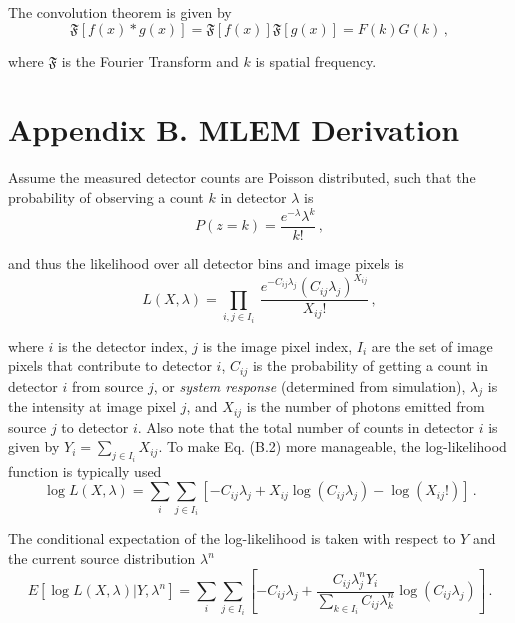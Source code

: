\documentclass[10pt]{article}
\begin{document}
\noindent The convolution theorem is given by
%
\begin{equation} \tag{A.3}
	\mathfrak{F}[f(x) \ast g(x)] = \mathfrak{F}[f(x)] \mathfrak{F}[g(x)] = F(k)G(k)\,,
\end{equation}

\noindent where $\mathfrak{F}$ is the Fourier Transform and $k$ is spatial frequency.


\section*{Appendix B. MLEM Derivation}

Assume the measured detector counts are Poisson distributed, such that the probability of observing a count $k$ in detector $\lambda$ is 
%
\begin{equation} \tag{B.1}
	P(z=k)  = \frac{e^{-\lambda} \lambda^k}{k!}\,,
\end{equation}

\noindent and thus the likelihood over all detector bins and image pixels is 
%
\begin{equation} \tag{B.2}
	L(X,\lambda) = \prod_{i,j\in I_i} \ \frac{e^{-C_{ij}\lambda_j} (C_{ij}\lambda_j)^{X_{ij}}}{X_{ij}!}\,,
\end{equation}

\noindent where $i$ is the detector index, $j$ is the image pixel index, $I_i$ are the set of image pixels that contribute to detector $i$, $C_{ij}$ is the probability of getting a count in detector $i$ from source $j$, or \emph{system response} (determined from simulation), $\lambda_j$ is the intensity at image pixel $j$, and $X_{ij}$ is the number of photons emitted from source $j$ to detector $i$. Also note that the total number of counts in detector $i$ is given by $Y_i=\sum_{j \in I_i} X_{ij}$. To make Eq. (B.2) more manageable, the log-likelihood function is typically used
%
\begin{equation} \tag{B.3}
	\log L(X,\lambda) = \sum_i \sum_{j \in I_i} \left[ -C_{ij} \lambda_j + X_{ij} \log (C_{ij} \lambda_j) - \log (X_{ij}!) \right]\,.
\end{equation}

\noindent The conditional expectation of the log-likelihood is taken with respect to $Y$ and the current source distribution $\lambda^n$
%
\begin{equation} \tag{B.4}
	E[\log L(X,\lambda) | Y,\lambda^n] = \sum_i \sum_{j \in I_i} \left[   -C_{ij} \lambda_j + \frac{C_{ij}\lambda_j^n Y_i}{\sum_{k \in I_i}C_{ij}\lambda_k^n }   \log (C_{ij} \lambda_j)   \right]\,.
\end{equation}
\end{document}
